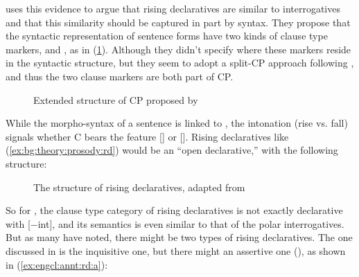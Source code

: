\textcite{farkasroelofsen2017} uses this evidence to argue that rising declaratives are similar to interrogatives and that this similarity should be captured in part by syntax.%
They propose that the syntactic representation of sentence forms have two kinds of clause type markers,  and , as in (\ref{fig:bg:fb2017}). Although they didn't specify where these markers reside in the syntactic structure, but they seem to adopt a split-CP approach following \textcite{rizzi1997}, and thus the two clause markers are both part of CP. 


\begin{figure}[H]
\begin{center}
\end{center}
\caption{Extended structure of CP proposed by \textcite{farkasroelofsen2017}}
\label{fig:bg:fb2017}
\end{figure}

While the morpho-syntax of a sentence is linked to , the intonation (rise vs. fall) signals whether C bears the feature [] or []. Rising declaratives like (\ref{ex:bg:theory:prosody:rd}) would be an ``open declarative,'' with the following structure:

\begin{figure}[H]
\begin{center}
\end{center}
\caption{The structure of rising declaratives, adapted from \textcite{farkasroelofsen2017}}
\label{fig:bg:fb2017rd}
\end{figure}

So for \textcite{farkasroelofsen2017}, the clause type category of rising declaratives is not exactly declarative with [$-$int], and its semantics is even similar to that of the polar interrogatives. But as many have noted, there might be two types of rising declaratives. The one discussed in \textcite{farkasroelofsen2017} is the inquisitive one, but there might an assertive one (\cite{jeong2018, goodhue2021rd}), as shown in (\ref{ex:engcl:annt:rd:a}):

